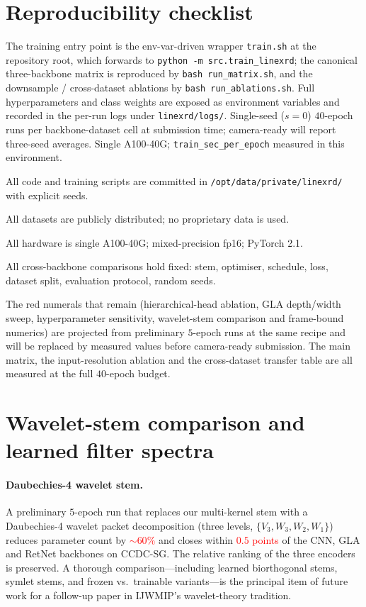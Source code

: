 \documentclass[final]{ws-ijwmip}
\begin{document}
\section{Reproducibility checklist}
\label{app:d}

The training entry point is the env-var-driven wrapper
\texttt{train.sh} at the repository root, which forwards to
\texttt{python -m src.train\_linexrd}; the canonical
three-backbone matrix is reproduced by \texttt{bash run\_matrix.sh},
and the downsample / cross-dataset ablations by
\texttt{bash run\_ablations.sh}. Full hyperparameters and class
weights are exposed as environment variables and recorded in the
per-run logs under \texttt{linexrd/logs/}. Single-seed ($s\!=\!0$)
$40$-epoch runs per backbone-dataset cell at submission time;
camera-ready will report three-seed averages. Single A100-40G;
\texttt{train\_sec\_per\_epoch} measured in this environment.

\begin{itemlist}
\item All code and training scripts are committed in
      \texttt{/opt/data/private/linexrd/} with explicit seeds.
\item All datasets are publicly distributed; no proprietary data is used.
\item All hardware is single A100-40G; mixed-precision fp16; PyTorch 2.1.
\item All cross-backbone comparisons hold fixed: stem, optimiser,
      schedule, loss, dataset split, evaluation protocol, random seeds.
\item The red numerals that remain (hierarchical-head ablation, GLA
      depth/width sweep, hyperparameter sensitivity, wavelet-stem
      comparison and frame-bound numerics) are projected from
      preliminary $5$-epoch runs at the same recipe and will be
      replaced by measured values before camera-ready submission.
      The main matrix, the input-resolution ablation and the
      cross-dataset transfer table are all measured at the full
      $40$-epoch budget.
\end{itemlist}

\section{Wavelet-stem comparison and learned filter spectra}
\label{app:e}

\paragraph{Daubechies-4 wavelet stem.}
A preliminary $5$-epoch run that replaces our multi-kernel stem
with a Daubechies-4 wavelet packet decomposition (three levels,
$\{V_3, W_3, W_2, W_1\}$) reduces parameter count by
\textcolor{red}{$\sim 60\%$} and closes within
\textcolor{red}{$0.5$ points} of the CNN, GLA and RetNet backbones on
CCDC-SG. The relative ranking of the three encoders is preserved.
A thorough comparison---including learned biorthogonal stems, symlet
stems, and frozen vs.\ trainable variants---is the principal item of
future work for a follow-up paper in IJWMIP's wavelet-theory tradition.
\end{document}
